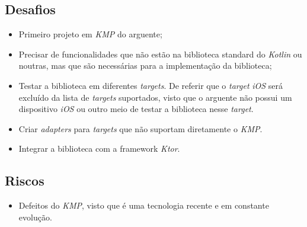 \subsection{Desafios}\label{subsec:desafios}
\begin{itemize}[topsep=0pt,itemsep=0pt,partopsep=0pt, parsep=0pt]
    \item Primeiro projeto em \textit{KMP} do arguente;
    \item Precisar de funcionalidades que não estão na biblioteca standard do \textit{Kotlin} ou noutras, mas que são necessárias para a implementação da biblioteca;
    \item Testar a biblioteca em diferentes \textit{targets}.
    De referir que o \textit{target} \textit{iOS} será excluído da lista de \textit{targets} suportados, visto que o arguente não possui um dispositivo \textit{iOS} ou outro meio de
    testar a biblioteca nesse \textit{target}.
    \item Criar \textit{adapters} para \textit{targets} que não suportam diretamente o \textit{KMP}.
    \item Integrar a biblioteca com a framework \textit{Ktor}.
\end{itemize}

\subsection{Riscos}\label{subsec:riscos}
\begin{itemize}[topsep=0pt,itemsep=0pt,partopsep=0pt, parsep=0pt]
    \item Defeitos do \textit{KMP}, visto que é uma tecnologia recente e em constante evolução.
\end{itemize}

